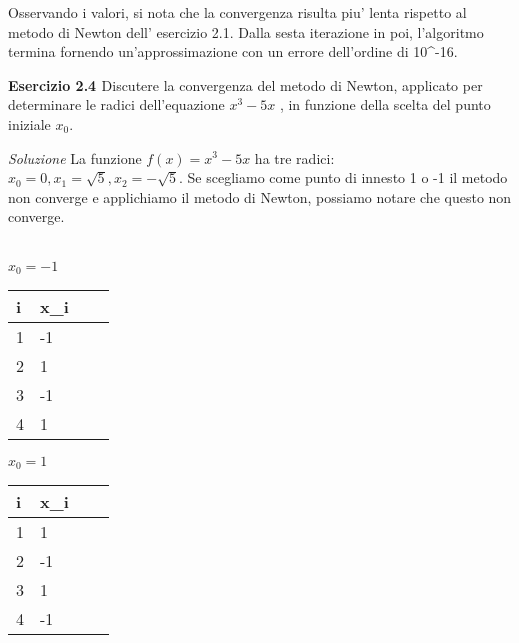 \documentclass[20pt,a4paper]{book}
\begin{document}
\vspace{2mm}

Osservando i valori, si nota che la convergenza risulta piu' lenta rispetto al metodo di Newton dell’ esercizio 2.1. Dalla sesta iterazione in poi, l'algoritmo termina fornendo un'approssimazione con un errore dell'ordine di 10^{-16}.


\vspace{10mm}

\textbf{\Large{Esercizio 2.4 }} Discutere la convergenza del metodo di Newton, applicato
per determinare le radici dell'equazione \begin{math}x^{3}-5x \end{math} , in funzione della scelta del punto iniziale \begin{math}x_{0}\end{math}.

\textit{Soluzione}
La funzione \begin{math}f(x)= x^{3}-5x\end{math} ha tre radici:\\
\begin{math} x_{0}=0, x_{1}=\sqrt{5}, x_{2}=-\sqrt{5}\end{math}.
Se scegliamo come punto di innesto 1 o -1 il metodo non converge e applichiamo il metodo di Newton, possiamo notare che questo non converge.

\\ \begin{math} x_{0}=-1\end{math}\\
\vspace{2mm}

\begin{tabular}{|l|l|l|l|}
\hline
i & x_{i}\\
\hline
1 & -1 \\
\hline
2 & 1 \\
\hline
3 & -1 \\
\hline
4 & 1 \\
\hline
\end{tabular}


\vspace{2mm}


\begin{math} x_{0}=1\end{math}\\

\vspace{2mm}

\begin{tabular}{|l|l|l|l|}
\hline
i & x_{i}\\
\hline
1 & 1 \\
\hline
2 & -1 \\
\hline
3 & 1 \\
\hline
4 & -1 \\
\hline
\end{tabular}
\end{document}
